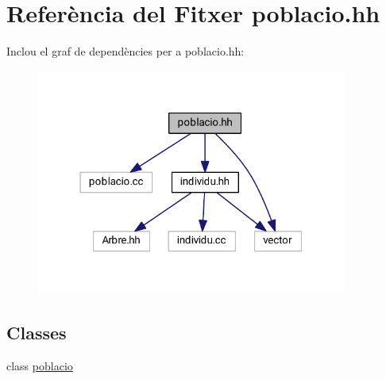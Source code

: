 \hypertarget{poblacio_8hh}{}\section{Referència del Fitxer poblacio.\+hh}
\label{poblacio_8hh}
Inclou el graf de dependències per a poblacio.\+hh\+:
\nopagebreak
\begin{figure}[H]
\begin{center}
\leavevmode
\includegraphics[width=289pt]{poblacio_8hh__incl}
\end{center}
\end{figure}
\subsection*{Classes}
\begin{DoxyCompactItemize}
\item 
class \hyperlink{classpoblacio}{poblacio}
\end{DoxyCompactItemize}
